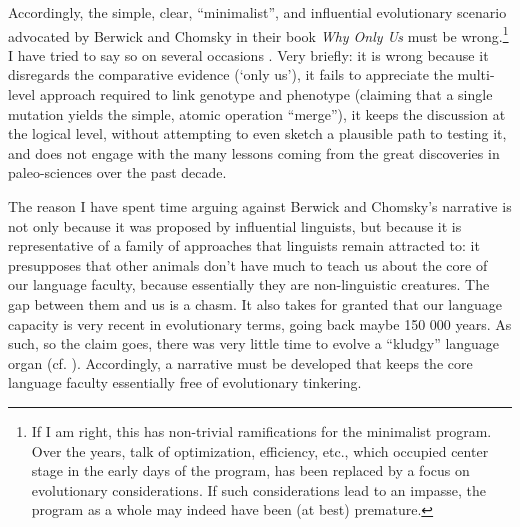 Accordingly, the simple, clear, ``minimalist'', and influential evolutionary scenario advocated by Berwick and Chomsky in their book \textit{Why Only Us} \citep{berwick2016only} must be wrong.\footnote{If I am right, this has non-trivial ramifications for the minimalist program. Over the years, talk of optimization, efficiency, etc., which occupied center stage in the early days of the program, has been replaced by a focus on evolutionary considerations. If such considerations lead to an impasse, the program as a whole may indeed have been (at best) premature.} I have tried to say so on several occasions \citep{boeckx2017not,martins2019language,de2020evolutionary}. Very briefly: it is wrong because it disregards the comparative evidence (`only us'), it fails to appreciate the multi-level approach required to link genotype and phenotype (claiming that a single mutation yields the simple, atomic operation ``merge''), it keeps the discussion at the logical level, without attempting to even sketch a plausible path to testing it, and does not engage with the many lessons coming from the great discoveries in paleo-sciences over the past decade.

The reason I have spent time arguing against Berwick and Chomsky's narrative is not only because it was proposed by influential linguists, but because it is representative of a family of approaches that linguists remain attracted to: it presupposes that other animals don't have much to teach us about the core of our language faculty, because essentially they are non-linguistic creatures. The gap between them and us is a chasm. It also takes for granted that our language capacity is very recent in evolutionary terms, going back maybe 150 000 years. As such, so the claim goes, there was very little time to evolve a ``kludgy'' language organ (cf. \cite{marcus2009kluge}). Accordingly, a narrative must be developed that keeps the core language faculty essentially free of evolutionary tinkering.

